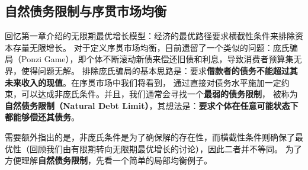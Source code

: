 \subsection{自然债务限制与序贯市场均衡}

回忆第一章介绍的无限期最优增长模型：经济的最优路径要求横截性条件来排除资本存量无限增长。
对于定义序贯市场均衡，目前遗留了一个类似的问题：庞氏骗局（Ponzi Game），即个体不断滚动新债来偿还旧债和利息，导致消费者预算集无界，使得问题无解。
排除庞氏骗局的基本思路是：要求\textbf{借款者的债务不能超过其未来收入的现值}。在序贯市场中我们将看到，
通过直接对债务水平施加一定约束，可以达成非庞氏条件。并且，我们通常会寻找一个\textbf{最弱的债务限制}，
被称为\textbf{自然债务限制（Natural Debt Limit）}，其想法是：\textbf{要求个体在任意可能状态下都能够偿还其债务}。

需要额外指出的是，非庞氏条件是为了确保解的存在性，而横截性条件则确保了最优性（回顾我们由有限期转向无限期最优增长的讨论），因此二者并不等同。
为了方便理解\textbf{自然债务限制}，先看一个简单的局部均衡例子。

